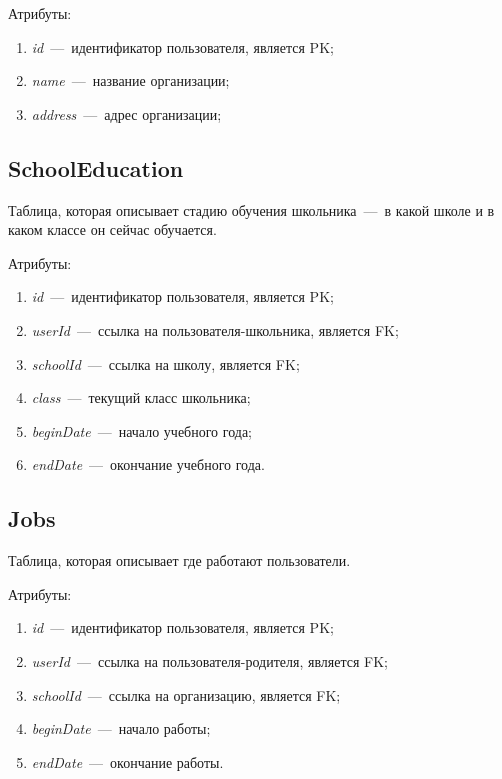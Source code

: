 \documentclass[14pt]{article}
\begin{document}
Атрибуты:
\begin{enumerate}
	\item \emph{id}~---~идентификатор пользователя, является PK; 
	\item \emph{name}~---~название организации;
	\item \emph{address}~---~адрес организации;
\end{enumerate}

\subsection{SchoolEducation}

Таблица, которая описывает стадию обучения школьника~---~в какой школе и в каком классе он сейчас обучается.

Атрибуты:
\begin{enumerate}
	\item \emph{id}~---~идентификатор пользователя, является PK; 
	\item \emph{userId}~---~ссылка на пользователя-школьника, является FK;
	\item \emph{schoolId}~---~ссылка на школу, является FK;
	\item \emph{class}~---~текущий класс школьника;
	\item \emph{beginDate}~---~начало учебного года;
	\item \emph{endDate}~---~окончание учебного года.
\end{enumerate}

\subsection{Jobs}

Таблица, которая описывает где работают пользователи.

Атрибуты:
\begin{enumerate}
	\item \emph{id}~---~идентификатор пользователя, является PK; 
	\item \emph{userId}~---~ссылка на пользователя-родителя, является FK;
	\item \emph{schoolId}~---~ссылка на организацию, является FK;
	\item \emph{beginDate}~---~начало работы;
	\item \emph{endDate}~---~окончание работы.
\end{enumerate}
\end{document}
